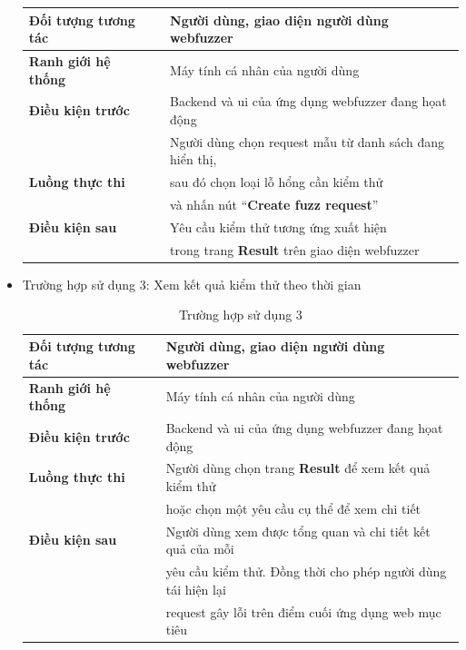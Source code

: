 \begin{itemize}
\begin{table}[ht]
\begin{tabular}[ht]{lll}
            \toprule[1pt]\midrule[0.3pt]
                \textbf{Đối tượng tương tác}& &Người dùng, giao diện người dùng webfuzzer\\ 
            \midrule
                \textbf{Ranh giới hệ thống}& &Máy tính cá nhân của người dùng\\
            \midrule
                \textbf{Điều kiện trước}& &Backend và \acrshort{ui} của ứng dụng webfuzzer đang họat động\\
            \midrule
                {}& &Người dùng chọn request mẫu từ danh sách đang hiển thị,\\
                \textbf{Luồng thực thi}& &sau đó chọn loại lỗ hổng cần kiểm thử\\
                {}& &và nhấn nút ``\textbf{Create fuzz request}''\\
            \midrule
                \textbf{Điều kiện sau}& &Yêu cầu kiểm thử tương ứng xuất hiện\\
                {}& &trong trang \textbf{Result} trên giao diện webfuzzer\\
            \midrule[0.3pt]\bottomrule[1pt]
        \end{tabular}
    \end{table}
    \FloatBarrier
    \item Trường hợp sử dụng 3: Xem kết quả kiểm thử theo thời gian
    \begin{table}[ht]
        \centering
        \caption{Trường hợp sử dụng 3}
        \label{tab:use-case-3}
        \begin{tabular}[ht]{lll}
            \toprule[1pt]\midrule[0.3pt]
                \textbf{Đối tượng tương tác}& &Người dùng, giao diện người dùng webfuzzer\\ 
            \midrule
                \textbf{Ranh giới hệ thống}& &Máy tính cá nhân của người dùng\\
            \midrule
                \textbf{Điều kiện trước}& &Backend và \acrshort{ui} của ứng dụng webfuzzer đang họat động\\
            \midrule
                \textbf{Luồng thực thi}& &Người dùng chọn trang \textbf{Result} để xem kết quả kiểm thử\\
                {}& &hoặc chọn một yêu cầu cụ thể để xem chi tiết\\
            \midrule
                \textbf{Điều kiện sau}& &Người dùng xem được tổng quan và chi tiết kết quả của mỗi\\
                {}& &yêu cầu kiểm thử. Đồng thời cho phép người dùng tái hiện lại\\
                {}& &request gây lỗi trên điểm cuối ứng dụng web mục tiêu\\
            \midrule[0.3pt]\bottomrule[1pt]
        \end{tabular}
    \end{table}
\end{itemize}
